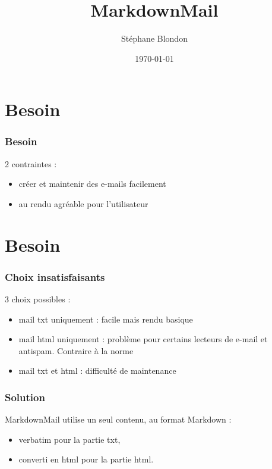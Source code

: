 \documentclass{beamer}
\title{MarkdownMail}
\author{Stéphane Blondon}
\date{\today}
\institute{Yaal}
\begin{document}
 



\frame{\titlepage}



\section{Besoin}
\begin{frame}
\frametitle{Besoin}

2 contraintes :
  \begin{itemize}
    \item<1-> créer et maintenir des e-mails facilement
    \item<2-> au rendu agréable pour l'utilisateur
  \end{itemize}

\end{frame}


\section{Besoin}
\begin{frame}
\frametitle{Choix insatisfaisants}

3 choix possibles :
  \begin{itemize}
    \item<1-> mail txt uniquement : facile mais rendu basique
    \item<2-> mail html uniquement : problème pour certains lecteurs de e-mail et antispam. Contraire à la norme
    \item<3-> mail txt et html : difficulté de maintenance
  \end{itemize}

\end{frame}

\begin{frame}[fragile]
\frametitle{Solution}
MarkdownMail utilise un seul contenu, au format Markdown :
    
  \begin{itemize}
    \item<1-> verbatim pour la partie txt,
    \item<2-> converti en html pour la partie html.
  \end{itemize}

\end{frame}
\end{document}
